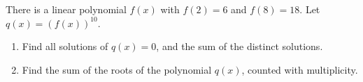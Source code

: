 There is a linear polynomial $f(x)$ with $f(2)=6$ and $f(8)=18$. Let $q(x)=\left(f(x)\right)^{10}$.
\begin{enumerate}
\item[(a)] Find all solutions of $q(x)=0$, and the sum of the distinct solutions.
\item[(b)] Find the sum of the roots of the polynomial $q(x)$, counted with multiplicity.
\end{enumerate}
